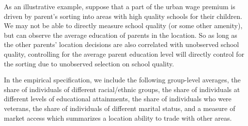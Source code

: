\documentclass[12pt,twoside]{article}
\begin{document}
As an illustrative example, suppose that a part of the urban wage premium is driven by parent's sorting into areas with high quality schools for their children. 
We may not be able to directly measure school quality (or some other amenity), but can observe the average education of parents in the location. 
So as long as the other parents' location decisions are also correlated with unobserved school quality, controlling for the average parent education level will  directly control for the sorting due to unobserved selection on school quality. 

In the empirical specification, we include the following group-level averages, the share of individuals of different racial/ethnic groups, the share of individuals at different levels of educational attainments, the share of individuals who were veterans, the share of individuals of different marital status, and a measure of market access which summarizes a location ability to trade with other areas.


\end{document}
